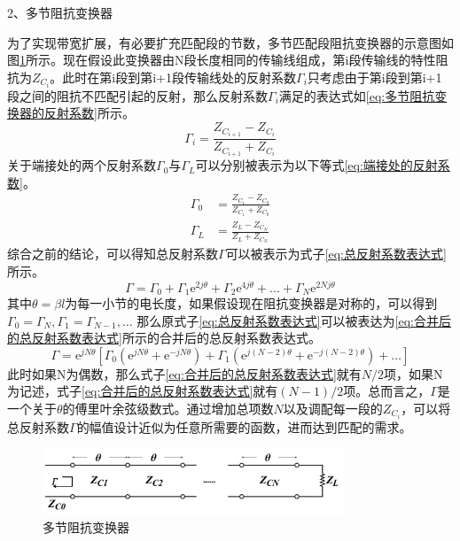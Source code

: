 \documentclass[master]{thesis-uestc}
\begin{document}
2、多节阻抗变换器

为了实现带宽扩展，有必要扩充匹配段的节数，多节匹配段阻抗变换器的示意图如图\ref{fig:多节阻抗变换器}所示。现在假设此变换器由N段长度相同的传输线组成，第i段传输线的特性阻抗为\(Z_{C_i}\)。此时在第i段到第i+1段传输线处的反射系数\(\Gamma_i\)只考虑由于第i段到第i+1段之间的阻抗不匹配引起的反射，那么反射系数\(\Gamma_i\)满足的表达式如\ref{eq:多节阻抗变换器的反射系数}所示。
\begin{equation}\label{eq:多节阻抗变换器的反射系数}
    \Gamma_i = \frac{Z_{C_{i+1}}-Z_{C_{i}}}{Z_{C_{i+1}}+Z_{C_{i}}}
\end{equation}
关于端接处的两个反射系数\(\Gamma_0\)与\(\Gamma_L\)可以分别被表示为以下等式\ref{eq:端接处的反射系数}。
\begin{subequations}\label{eq:端接处的反射系数}
    \begin{align}
        \Gamma_0 &= \frac{Z_{C_1}-Z_{C_0}}{Z_{C_1}+Z_{C_0}} \\
        \Gamma_L &= \frac{Z_L-Z_{C_N}}{Z_L+Z_{C_N}}
    \end{align}
\end{subequations}
综合之前的结论，可以得知总反射系数\(\Gamma\)可以被表示为式子\ref{eq:总反射系数表达式}所示。
\begin{equation}\label{eq:总反射系数表达式}
    \Gamma = \Gamma_0+\Gamma_1 \mathrm{e}^{2 j \theta}+\Gamma_2 \mathrm{e}^{4 j \theta}+...+\Gamma_N \mathrm{e}^{2 N j \theta}
\end{equation}
其中\(\theta = \beta l\)为每一小节的电长度，如果假设现在阻抗变换器是对称的，可以得到\(\Gamma_0 = \Gamma_N, \Gamma_1 = \Gamma_{N-1}, \dots \)
那么原式子\ref{eq:总反射系数表达式}可以被表达为\ref{eq:合并后的总反射系数表达式}所示的合并后的总反射系数表达式。
\begin{equation}\label{eq:合并后的总反射系数表达式}
    \Gamma = \mathrm{e}^{j  N \theta} \left[\Gamma_0\left(\mathrm{e}^{j N \theta}+\mathrm{e}^{- j N \theta} \right) + \Gamma_1\left(\mathrm{e}^{j (N-2) \theta}+\mathrm{e}^{- j (N-2) \theta} \right) + \dots \right]
\end{equation}
此时如果N为偶数，那么式子\ref{eq:合并后的总反射系数表达式}就有\(N/2\)项，如果N为记述，式子\ref{eq:合并后的总反射系数表达式}就有\((N-1)/2\)项。总而言之，\(\Gamma\)是一个关于\(\theta\)的傅里叶余弦级数式。通过增加总项数\(N\)以及调配每一段的\(Z_{C_i}\)，可以将总反射系数\(\Gamma\)的幅值设计近似为任意所需要的函数，进而达到匹配的需求。
\begin{figure}[!htb]
    \centering
    \includegraphics[width=0.8\textwidth]{pic/chapter2/多节阻抗匹配示意图.png}
    \caption{多节阻抗变换器}
    \label{fig:多节阻抗变换器}
\end{figure}
\end{document}
